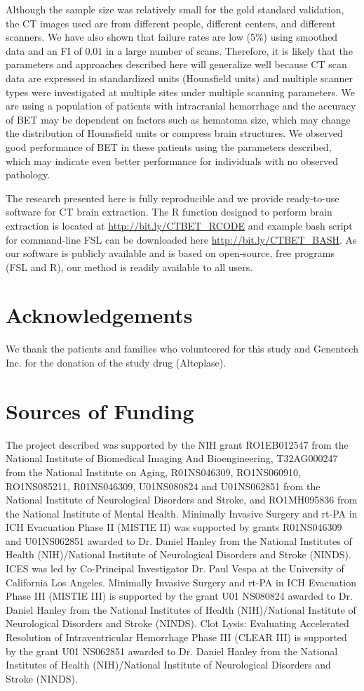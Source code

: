 \documentclass{elsarticle}\usepackage[]{graphicx}\usepackage[]{color}
\begin{document}
Although the sample size was relatively small for the gold standard validation, the CT images used are from different people, different centers, and different scanners.  We have also shown that failure rates are low (5\%) using smoothed data and an FI of $0.01$ in a large number of scans.
Therefore, it is likely that the parameters and approaches described here will generalize well because CT scan data are expressed in standardized units (Hounsfield units) and multiple scanner types were investigated at multiple sites under multiple scanning parameters.  We are using a population of patients with intracranial hemorrhage and the accuracy of BET may be dependent on factors such as hematoma size, which may change the distribution of Hounsfield units or compress brain structures.  We observed good performance of BET in these patients using the parameters described, which may indicate even better performance for individuals with no observed pathology.

The research presented here is fully reproducible and we provide ready-to-use software for CT brain extraction. The R function designed to perform brain extraction is located at
\url{http://bit.ly/CTBET_RCODE} and example bash script for command-line FSL can be downloaded here \url{http://bit.ly/CTBET_BASH}.  As our software is publicly available and is based on open-source, free programs (FSL and R), our method is readily available to all users.

\section*{Acknowledgements}
We thank the patients and families who volunteered for this study and Genentech Inc. for the donation of the study drug (Alteplase).

\section*{Sources of Funding}
The project described was supported by the NIH grant RO1EB012547 from the National Institute of Biomedical Imaging And Bioengineering, T32AG000247 from the National Institute on Aging, R01NS046309, RO1NS060910, RO1NS085211, R01NS046309, U01NS080824 and U01NS062851 from the National Institute of Neurological Disorders and Stroke, and RO1MH095836 from the National Institute of Mental Health. Minimally Invasive Surgery and rt-PA in ICH Evacuation Phase II (MISTIE II) was supported by grants R01NS046309 and U01NS062851 awarded to Dr. Daniel Hanley from the National Institutes of Health (NIH)/National Institute of Neurological Disorders and Stroke (NINDS).  ICES was led by Co-Principal Investigator Dr. Paul Vespa at the University of California Los Angeles. Minimally Invasive Surgery and rt-PA in ICH Evacuation Phase III (MISTIE III) is supported by the grant U01 NS080824 awarded to Dr. Daniel Hanley from the National Institutes of Health (NIH)/National Institute of Neurological Disorders and Stroke (NINDS). Clot Lysis: Evaluating Accelerated Resolution of Intraventricular Hemorrhage Phase III (CLEAR III) is supported by the grant U01 NS062851 awarded to Dr. Daniel Hanley from the National Institutes of Health (NIH)/National Institute of Neurological Disorders and Stroke (NINDS). 
\end{document}
